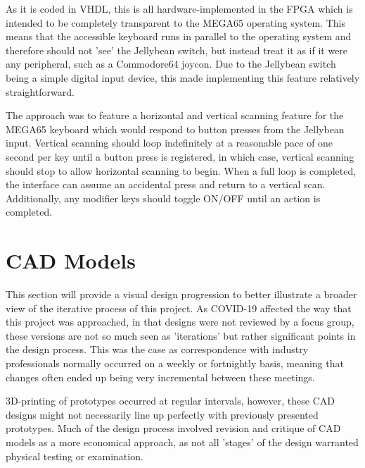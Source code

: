 As it is coded in VHDL, this is all hardware-implemented in the FPGA which is intended to be completely transparent to the MEGA65 operating system.
This means that the accessible keyboard runs in parallel to the operating system and therefore should not 'see' the Jellybean switch, but instead treat it as if it were any peripheral, such as a Commodore64 joycon.
Due to the Jellybean switch being a simple digital input device, this made implementing this feature relatively straightforward.

The approach was to feature a horizontal and vertical scanning feature for the MEGA65 keyboard which would respond to button presses from the Jellybean input.
Vertical scanning should loop indefinitely at a reasonable pace of one second per key until a button press is registered, in which case, vertical scanning should stop to allow horizontal scanning to begin.
When a full loop is completed, the interface can assume an accidental press and return to a vertical scan. %
Additionally, any modifier keys should toggle ON/OFF until an action is completed.


\section{CAD Models}
This section will provide a visual design progression to better illustrate a broader view of the iterative process of this project.
As COVID-19 affected the way that this project was approached, in that designs were not reviewed by a focus group, these versions are not so much seen as 'iterations' but rather significant points in the design process.
This was the case as correspondence with industry professionals normally occurred on a weekly or fortnightly basis, meaning that changes often ended up being very incremental between these meetings.

3D-printing of prototypes occurred at regular intervals, however, these CAD designs might not necessarily line up perfectly with previously presented prototypes.
Much of the design process involved revision and critique of CAD models as a more economical approach, as not all 'stages' of the design warranted physical testing or examination.

